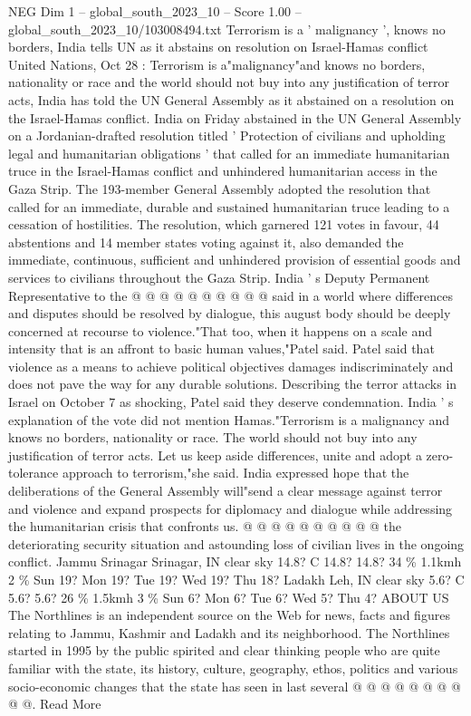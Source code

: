 \begin{textsample}{NEG Dim 1 – global\_south\_2023\_10 – Score 1.00 – global\_south\_2023\_10/103008494.txt}  \label{ex:f1_neg_399}
Terrorism is a ' malignancy ', knows no borders, India tells UN as it abstains on resolution on Israel-Hamas conflict United Nations, Oct 28 : Terrorism is a"malignancy"and knows no borders, nationality or race and the world should not buy into any justification of terror acts, India has told the UN General Assembly as it abstained on a resolution on the Israel-Hamas conflict.
India on Friday abstained in the UN General Assembly on a Jordanian-drafted resolution titled ' Protection of civilians and upholding legal and humanitarian obligations ' that called for an immediate humanitarian truce in the Israel-Hamas conflict and unhindered humanitarian access in the Gaza Strip.
The 193-member General Assembly adopted the resolution that called for an immediate, durable and sustained humanitarian truce leading to a cessation of hostilities.
The resolution, which garnered 121 votes in favour, 44 abstentions and 14 member states voting against it, also demanded the immediate, continuous, sufficient and unhindered provision of essential goods and services to civilians throughout the Gaza Strip.
India ' s Deputy Permanent Representative to the @ @ @ @ @ @ @ @ @ @ said in a world where differences and disputes should be resolved by dialogue, this august body should be deeply concerned at recourse to violence."That too, when it happens on a scale and intensity that is an affront to basic human values,"Patel said.
Patel said that violence as a means to achieve political objectives damages indiscriminately and does not pave the way for any durable solutions.
Describing the terror attacks in Israel on October 7 as shocking, Patel said they deserve condemnation.
India ' s explanation of the vote did not mention Hamas."Terrorism is a malignancy and knows no borders, nationality or race.
The world should not buy into any justification of terror acts.
Let us keep aside differences, unite and adopt a zero-tolerance approach to terrorism,"she said.
India expressed hope that the deliberations of the General Assembly will"send a clear message against terror and violence and expand prospects for diplomacy and dialogue while addressing the humanitarian crisis that confronts us. @ @ @ @ @ @ @ @ @ @ the deteriorating security situation and astounding loss of civilian lives in the ongoing conflict.
Jammu Srinagar Srinagar, IN clear sky 14.8?
C 14.8? 14.8? 34 \% 1.1kmh 2 \% Sun 19?
Mon 19?
Tue 19?
Wed 19?
Thu 18?
Ladakh Leh, IN clear sky 5.6?
C 5.6? 5.6? 26 \% 1.5kmh 3 \% Sun 6?
Mon 6?
Tue 6?
Wed 5?
Thu 4?
ABOUT US The Northlines is an independent source on the Web for news, facts and figures relating to Jammu, Kashmir and Ladakh and its neighborhood.
The Northlines started in 1995 by the public spirited and clear thinking people who are quite familiar with the state, its history, culture, geography, ethos, politics and various socio-economic changes that the state has seen in last several @ @ @ @ @ @ @ @ @ @.
Read More

\end{textsample}

